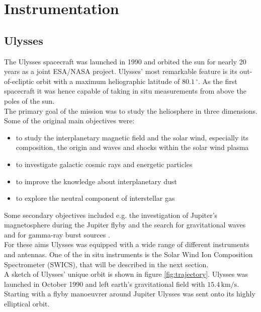 
\chapter{Instrumentation} %

\label{chapter:instrumentation} 



\section{Ulysses}
\label{sec:ulysses}
The Ulysses spacecraft \citep{wenzel_ulysses} was launched in 1990 and orbited the sun for nearly 20 years as a joint ESA/NASA project.
Ulysses' most remarkable feature is its out-of-ecliptic orbit with a maximum heliographic latitude of $80.1\,^\circ$.
As the first spacecraft it was hence capable of taking in situ measurements from above the poles of the sun.\\
The primary goal of the mission was to study the heliosphere in three dimensions. Some of the original main objectives were:
\begin{itemize}
	\item to study the interplanetary magnetic field and the solar wind, especially its composition, the origin and waves and shocks within the solar wind plasma
	\item to investigate galactic cosmic rays and energetic particles
	\item to improve the knowledge about interplanetary dust
	\item to explore the neutral component of interstellar gas
\end{itemize}
Some secondary objectives included e.g. the investigation of Jupiter's magnetosphere during the Jupiter flyby and the search for gravitational waves and for gamma-ray burst sources \citep{wenzel_ulysses}.
\\
For these aims Ulysses was equipped with a wide range of different instruments and antennas. One of the in situ instruments is the Solar Wind Ion Composition Spectrometer (SWICS), that will be described in the next section.\\
A sketch of Ulysses' unique orbit is shown in figure \ref{fig:trajectory}.
Ulysses was launched in October 1990 and left earth's gravitational field with $15.4\,\mathrm{km/s}$. Starting with a flyby manoeuvrer around Jupiter Ulysses was sent onto its highly elliptical orbit.
